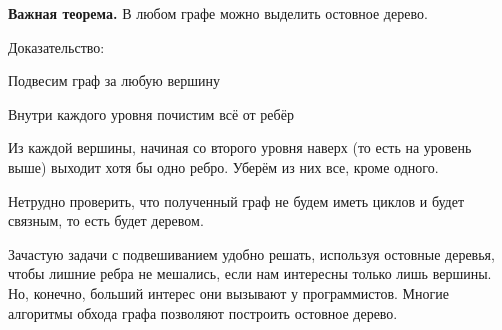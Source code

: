 \textbf{Важная теорема.} В любом графе можно выделить остовное дерево.

Доказательство:

\hspace{3mm}  Подвесим граф за любую вершину

\hspace{3mm}  Внутри каждого уровня почистим всё от ребёр 

\hspace{3mm}  Из каждой вершины, начиная со второго уровня наверх (то есть на уровень выше) выходит хотя бы одно ребро. Уберём из них все, кроме одного.

Нетрудно проверить, что полученный граф не будем иметь циклов и будет связным, то есть будет деревом.

Зачастую задачи с подвешиванием удобно решать, используя остовные деревья, чтобы лишние ребра не мешались, если нам интересны только лишь вершины. Но, конечно, больший интерес они вызывают у программистов. Многие алгоритмы обхода графа позволяют построить остовное дерево. 